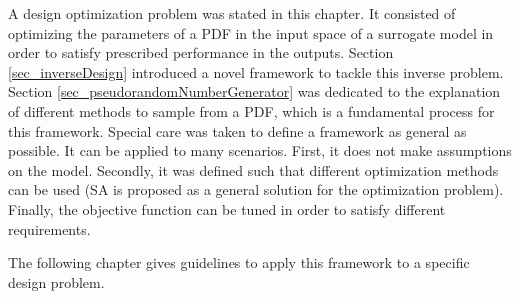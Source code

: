 \vspace{10mm}
\noindent
A design optimization problem was stated in this chapter. 
It consisted of optimizing the parameters of a PDF in the input space of a surrogate model in order to satisfy prescribed performance in the outputs.
Section \ref{sec_inverseDesign} introduced a novel framework to tackle this inverse problem.
Section \ref{sec_pseudorandomNumberGenerator} was dedicated to the explanation of different methods to sample from a PDF, which is a fundamental process for this framework.
Special care was taken to define a framework as general as possible.
It can be applied to many scenarios. First, it does not make assumptions on the model. Secondly, it was defined such that different optimization methods can be used (SA is proposed as a general solution for the optimization problem).
Finally, the objective function can be tuned in order to satisfy different requirements.

The following chapter gives guidelines to apply this framework to a specific design problem.



